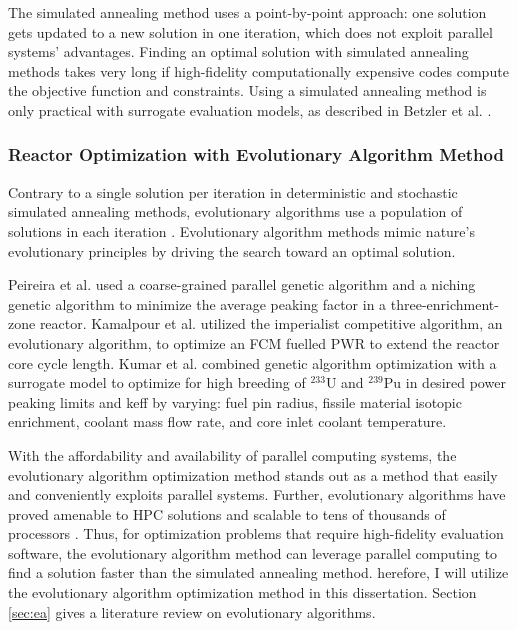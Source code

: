 The simulated annealing method uses a point-by-point approach:
one solution gets updated to a new solution in one iteration, which does not 
exploit parallel systems' advantages.
Finding an optimal solution with simulated annealing methods takes very long if 
high-fidelity computationally expensive codes compute the objective function and 
constraints.
Using a simulated annealing method is only practical with surrogate evaluation models, 
as described in Betzler et al. \cite{betzler_design_2019}.

\subsubsection{Reactor Optimization with Evolutionary Algorithm Method}
Contrary to a single solution per iteration in deterministic and stochastic 
simulated annealing methods, evolutionary algorithms use a population of 
solutions in each iteration \cite{deb_multi-objective_2001}. 
Evolutionary algorithm methods mimic nature's evolutionary principles by driving 
the search toward an optimal solution.

Peireira et al. \cite{pereira_coarse-grained_2003,pereira_parallel_2008} 
used a coarse-grained parallel genetic algorithm and a niching genetic algorithm
to minimize the average peaking factor in a three-enrichment-zone reactor. 
Kamalpour et al. \cite{kamalpour_smart_2020} utilized the imperialist competitive 
algorithm, an evolutionary algorithm, to optimize an \gls{FCM} fuelled 
\gls{PWR} to extend the reactor core cycle length. 
Kumar et al. \cite{kumar_new_2015} combined genetic algorithm optimization 
with a surrogate model to optimize for high breeding of $^{233}$U and $^{239}$Pu 
in desired power peaking limits and keff by varying: fuel pin 
radius,  fissile material isotopic enrichment, coolant mass flow rate, and 
core inlet coolant temperature.

With the affordability and availability of parallel computing systems, the 
evolutionary algorithm optimization method stands out as a method 
that easily and conveniently exploits parallel systems. 
Further, evolutionary algorithms have proved amenable to \gls{HPC} solutions and 
scalable to tens of thousands of processors \cite{kropaczek_constraint_2019}. 
Thus, for optimization problems that require high-fidelity evaluation software, 
the evolutionary algorithm method can leverage parallel computing to find a 
solution faster than the simulated annealing method.
herefore, I will utilize the evolutionary algorithm optimization method in 
this dissertation.
Section \ref{sec:ea} gives a literature review on evolutionary algorithms.

